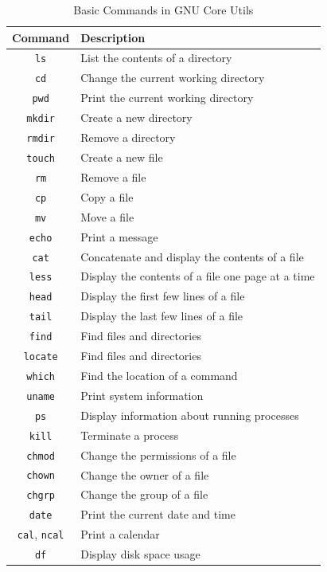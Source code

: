 \vfill
\pagebreak
\begin{table}[h!]
\caption{Basic Commands in GNU Core Utils}
\begin{tabular}{ c l }
  \toprule
 Command & Description \\
 \midrule
  \texttt{ls} & List the contents of a directory \\
  \texttt{cd} & Change the current working directory \\
  \texttt{pwd} & Print the current working directory \\
  \texttt{mkdir} & Create a new directory \\
  \texttt{rmdir} & Remove a directory \\
  \texttt{touch} & Create a new file \\
  \texttt{rm} & Remove a file \\
  \texttt{cp} & Copy a file \\
  \texttt{mv} & Move a file \\
  \texttt{echo} & Print a message \\
  \texttt{cat} & Concatenate and display the contents of a file \\
  \texttt{less} & Display the contents of a file one page at a time \\
  \texttt{head} & Display the first few lines of a file \\
  \texttt{tail} & Display the last few lines of a file \\
  \texttt{find} & Find files and directories \\
  \texttt{locate} & Find files and directories \\
  \texttt{which} & Find the location of a command \\
  \texttt{uname} & Print system information \\
  \texttt{ps} & Display information about running processes \\
  \texttt{kill} & Terminate a process \\
  \texttt{chmod} & Change the permissions of a file \\
  \texttt{chown} & Change the owner of a file \\
  \texttt{chgrp} & Change the group of a file \\
  \texttt{date} & Print the current date and time \\
  \texttt{cal}, \texttt{ncal} & Print a calendar \\
  \texttt{df} & Display disk space usage \\

\end{tabular}
\end{table}
